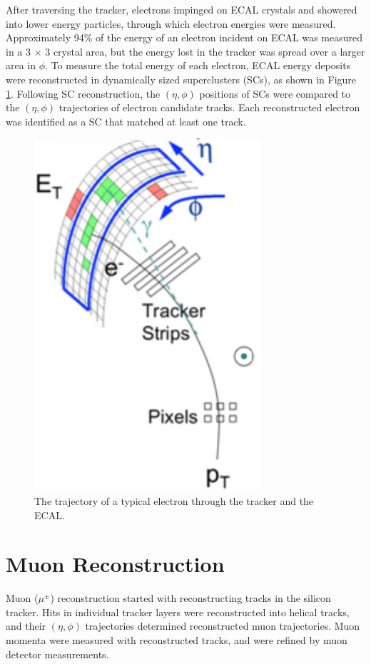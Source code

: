 After traversing the tracker, electrons impinged on ECAL crystals and showered into lower energy particles, 
through which electron energies were measured.  Approximately 94\% of the energy of an electron 
incident on ECAL was measured in a 3 $\times$ 3 crystal area, but the energy lost in the tracker was spread 
over a larger area in $\phi$.  To measure the total energy of each electron, ECAL energy deposits were 
reconstructed in dynamically sized superclusters (SCs), as shown in Figure \ref{fig:eleTrackAndSC}.  Following 
SC reconstruction, the $(\eta, \phi)$ positions of SCs were compared to the $(\eta, \phi)$ trajectories of 
electron candidate tracks.  Each reconstructed electron was identified as a SC that matched at least one track.

\begin{figure}[h]
	\centering
	\includegraphics[width=0.75\textwidth]{figures/electronTrackAndSupercluster.png}
	\caption{The trajectory of a typical electron through the tracker and the ECAL.}
	\label{fig:eleTrackAndSC}
\end{figure}


\section{Muon Reconstruction}
\label{sec:muReco}
Muon ($\mu^{\pm}$) reconstruction started with reconstructing tracks in the silicon tracker.  
Hits in individual tracker layers were reconstructed into helical tracks, and their $(\eta, \phi)$ 
trajectories determined reconstructed muon trajectories.  Muon momenta were measured with 
reconstructed tracks, and were refined by muon detector measurements.

